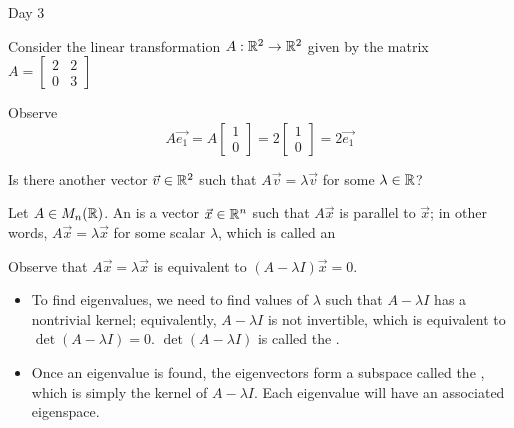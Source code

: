 
\begin{applicationActivities}{Day 3}

\begin{activity}{0}
Consider the linear transformation $A : \mathbb{R}^2 \rightarrow \mathbb{R}^2$ given by the matrix $A = \begin{bmatrix} 2 & 2 \\ 0 & 3 \end{bmatrix}$

\begin{center}
\end{center}
Observe $$A\vec{e_1} = A\begin{bmatrix}1 \\ 0 \end{bmatrix} = 2 \begin{bmatrix}1 \\ 0 \end{bmatrix} = 2 \vec{e_1}$$

Is there another vector $\vec{v} \in \mathbb{R}^2$ such that $A\vec{v}=\lambda \vec{v}$ for some $\lambda \in \mathbb{R}$?
\end{activity}

\begin{definition}Let $A \in M_n(\mathbb{R})$.
An  is a vector $\vec{x} \in \mathbb{R}^n$ such that $A\vec{x}$ is parallel to $\vec{x}$; in other words, $A\vec{x}=\lambda \vec{x}$ for some scalar $\lambda$, which is called an 
\end{definition}

\begin{observation}
Observe that $A\vec{x}=\lambda \vec{x}$ is equivalent to $(A-\lambda I)\vec{x} = 0$.
\begin{itemize}
\item To find eigenvalues, we need to find values of $\lambda$ such that $A-\lambda I$ has a nontrivial kernel; equivalently, $A-\lambda I$ is not invertible, which is equivalent to $\det(A-\lambda I)=0$.  $\det(A-\lambda I)$ is called the .
\item Once an eigenvalue is found, the eigenvectors form a subspace called the , which is simply the kernel of $A-\lambda I$.  Each eigenvalue will have an associated eigenspace.
\end{itemize}
\end{observation}


\end{applicationActivities}
